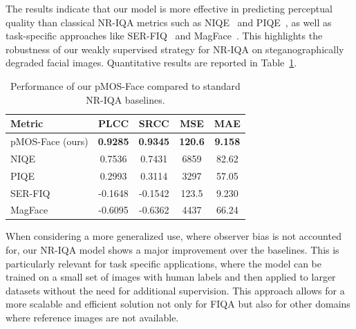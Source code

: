 The results indicate that our model is more effective in predicting perceptual quality than classical NR-IQA metrics such as NIQE~\cite{mittal2013making} and PIQE~\cite{piqe2016}, as well as task-specific approaches like SER-FIQ~\cite{terhorst2020serfiq} and MagFace~\cite{meng2021magface}. This highlights the robustness of our weakly supervised strategy for NR-IQA on steganographically degraded facial images. Quantitative results are reported in Table~\ref{tab:nr_scores}.

\begin{table}
\centering
\caption{Performance of our pMOS-Face compared to standard NR-IQA baselines.}\label{tab:nr_scores}
\begin{tabular}{lcccc}
\hline %
\textbf{Metric} & \textbf{PLCC} & \textbf{SRCC} & \textbf{MSE} & \textbf{MAE} \\
\hline %
pMOS-Face (ours) & \textbf{0.9285} & \textbf{0.9345} & \textbf{120.6} & \textbf{9.158} \\
NIQE                 & 0.7536          & 0.7431          & 6859        & 82.62 \\
PIQE                 & 0.2993          & 0.3114          & 3297        & 57.05 \\
SER-FIQ              & -0.1648         & -0.1542         & 123.5         & 9.230 \\
MagFace              & -0.6095         & -0.6362         & 4437        & 66.24 \\
\hline %
\end{tabular}
\end{table}

When considering a more generalized use, where observer bias is not accounted for, our NR-IQA model shows a major improvement over the baselines. This is particularly relevant for task specific applications, where the model can be trained on a small set of images with human labels and then applied to larger datasets without the need for additional supervision. This approach allows for a more scalable and efficient solution not only for FIQA but also for other domains where reference images are not available.
